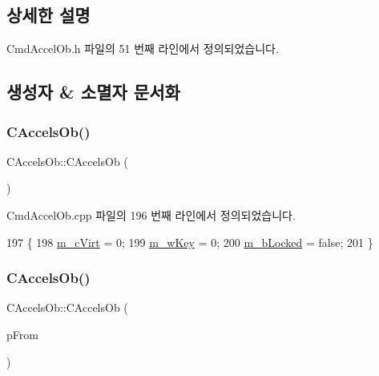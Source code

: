 \subsection{상세한 설명}


Cmd\+Accel\+Ob.\+h 파일의 51 번째 라인에서 정의되었습니다.



\subsection{생성자 \& 소멸자 문서화}
\mbox{\label{class_c_accels_ob_a6245b2db041ed3ba0aec609bbb1654cf}} 
\subsubsection{\texorpdfstring{C\+Accels\+Ob()}{CAccelsOb()}\hspace{0.1cm}{\footnotesize\ttfamily [1/4]}}
{\footnotesize\ttfamily C\+Accels\+Ob\+::\+C\+Accels\+Ob (\begin{DoxyParamCaption}{ }\end{DoxyParamCaption})}



Cmd\+Accel\+Ob.\+cpp 파일의 196 번째 라인에서 정의되었습니다.


\begin{DoxyCode}
197 \{
198   \mbox{\hyperlink{class_c_accels_ob_a08b7003ccf92c6afcf31878960d8eee1}{m\_cVirt}} = 0;
199   \mbox{\hyperlink{class_c_accels_ob_a1891250e9a4d00c0862f3a90a965d635}{m\_wKey}} = 0;
200   \mbox{\hyperlink{class_c_accels_ob_ad8300bd20bd429ad61f89700e388dd9a}{m\_bLocked}} = \textcolor{keyword}{false};
201 \}
\end{DoxyCode}
\mbox{\label{class_c_accels_ob_afca345908aafde57de46430bbf2018d9}} 
\subsubsection{\texorpdfstring{C\+Accels\+Ob()}{CAccelsOb()}\hspace{0.1cm}{\footnotesize\ttfamily [2/4]}}
{\footnotesize\ttfamily C\+Accels\+Ob\+::\+C\+Accels\+Ob (\begin{DoxyParamCaption}\item[{\mbox{\hyperlink{class_c_accels_ob}{C\+Accels\+Ob}} $\ast$}]{p\+From }\end{DoxyParamCaption})}



